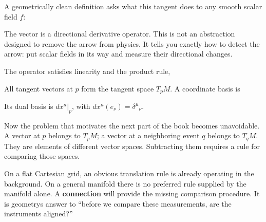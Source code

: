 \documentclass[
  11pt,
  letterpaper,
  oneside,
  openany]{scrbook}
\begin{document}
A geometrically clean definition asks what this tangent does to any
smooth scalar field \(f\):

\begin{center}
\begingroup
{}
\ifdim\wd\grmathbox>\linewidth
\resizebox{\linewidth}{!}{\usebox{\grmathbox}}
\else\usebox{\grmathbox}\fi
\endgroup
\end{center}

The vector is a directional derivative operator. This is not an
abstraction designed to remove the arrow from physics. It tells you
exactly how to detect the arrow: put scalar fields in its way and
measure their directional changes.

The operator satisfies linearity and the product rule,

\begin{center}
\begingroup
{}
\ifdim\wd\grmathbox>\linewidth
\resizebox{\linewidth}{!}{\usebox{\grmathbox}}
\else\usebox{\grmathbox}\fi
\endgroup
\end{center}

All tangent vectors at \(p\) form the tangent space \(T_pM\). A
coordinate basis is

\begin{center}
\begingroup
{}
\ifdim\wd\grmathbox>\linewidth
\resizebox{\linewidth}{!}{\usebox{\grmathbox}}
\else\usebox{\grmathbox}\fi
\endgroup
\end{center}

Its dual basis is \(dx^\mu|_p\), with
\(dx^\mu(e_\nu)=\delta^\mu{}_{\nu}\).

Now the problem that motivates the next part of the book becomes
unavoidable. A vector at \(p\) belongs to \(T_pM\); a vector at a
neighboring event \(q\) belongs to \(T_qM\). They are elements of
different vector spaces. Subtracting them requires a rule for comparing
those spaces.

On a flat Cartesian grid, an obvious translation rule is already
operating in the background. On a general manifold there is no preferred
rule supplied by the manifold alone. A \textbf{connection} will provide
the missing comparison procedure. It is geometry\textquotesingle s
answer to ``before we compare these measurements, are the instruments
aligned?''
\end{document}
